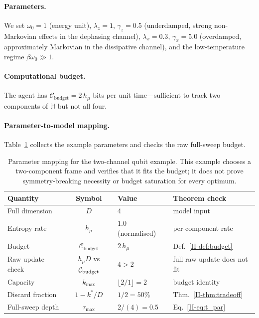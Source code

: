 \documentclass[12pt,a4paper,openany]{book}
\begin{document}
\paragraph{Parameters.}
We set $\omega_0 = 1$ (energy unit),
$\lambda_z = 1$, $\gamma_z = 0.5$ (underdamped, strong
non-Markovian effects in the dephasing channel),
$\lambda_x = 0.3$, $\gamma_x = 5.0$ (overdamped,
approximately Markovian in the dissipative channel),
and the low-temperature regime $\beta\omega_0 \gg 1$.

\paragraph{Computational budget.}
The agent has
$\mathcal{C}_{\mathrm{budget}} = 2\,h_\mu$
bits per unit time---sufficient to track two components
of $\mathbb{H}$ but not all four.

\paragraph{Parameter-to-model mapping.}
Table~\ref{II-tab:params} collects the example parameters and
checks the raw full-sweep budget.

\begin{table}[t]
\centering
\small
\begin{tabular}{@{}lcll@{}}
\toprule
\textbf{Quantity} & \textbf{Symbol} & \textbf{Value}
  & \textbf{Theorem check} \\
\midrule
Full dimension & $D$ & $4$ &
  model input \\
Entropy rate & $h_\mu$ & $1.0$ (normalised) &
  per-component rate \\
Budget & $\mathcal{C}_{\mathrm{budget}}$ & $2\,h_\mu$
  & Def.~\ref{II-def:budget} \\
\midrule
Raw update check & $h_\mu D$ vs $\mathcal{C}_{\rm budget}$
  & $4 > 2$ & full raw update does not fit \\
Capacity & $k_{\max}$ & $\lfloor 2/1 \rfloor = 2$
  & budget identity \\
Discard fraction & $1 - k^*/D$ & $1/2 = 50\%$
  & Thm.~\ref{II-thm:tradeoff} \\
Full-sweep depth & $\tau_{\max}$ & $2/(4) = 0.5$
  & Eq.~\eqref{II-eq:t_par} \\
\bottomrule
\end{tabular}
\caption{Parameter mapping for the two-channel qubit
example.  This example chooses a two-component frame and verifies that
it fits the budget; it does not prove symmetry-breaking necessity or
budget saturation for every optimum.}
\label{II-tab:params}
\end{table}
\end{document}
